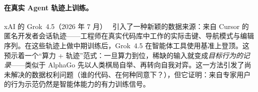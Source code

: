 \paragraph{在真实 Agent 轨迹上训练。}
xAI 的 Grok~4.5（2026 年 7 月）~\cite{grok45_2026} 引入了一种新颖的数据来源：来自 Cursor 的匿名开发者会话轨迹——工程师在真实代码库中工作的实际击键、导航模式与编辑序列。在这些轨迹上做中期训练后，Grok~4.5 在智能体工具使用基准上登顶。这预示着一个“算力 + 轨迹”范式：一旦算力到位，稀缺的输入就变成\emph{目标行为的记录}——类似于 AlphaGo 先以人类棋局自举、再转向自我对弈。这一方法引发了尚未解决的数据权利问题（谁的代码、在何种同意下？），但它证明：来自专家用户的行为示范仍然是智能体能力的有力训练信号。
